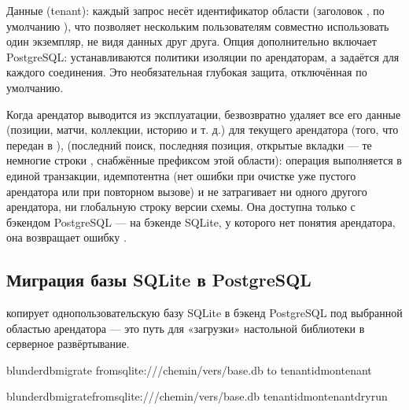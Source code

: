 \documentclass[letterpaper,10pt,russian]{sphinxmanual}
\begin{document}
\sphinxAtStartPar
Данные  (tenant): каждый запрос несёт идентификатор области (заголовок , по умолчанию ), что позволяет нескольким пользователям совместно использовать один экземпляр, не видя данных друг друга. Опция  дополнительно включает  PostgreSQL: устанавливаются политики изоляции по арендаторам, а  задаётся для каждого соединения. Это необязательная глубокая защита, отключённая по умолчанию.

\sphinxAtStartPar
Когда арендатор выводится из эксплуатации,  безвозвратно удаляет все его данные (позиции, матчи, коллекции, историю и т. д.) для текущего арендатора (того, что передан в ),  (последний поиск, последняя позиция, открытые вкладки — те немногие строки , снабжённые префиксом этой области): операция выполняется в единой транзакции, идемпотентна (нет ошибки при очистке уже пустого арендатора или при повторном вызове) и не затрагивает ни одного другого арендатора, ни глобальную строку версии схемы. Она доступна только с бэкендом PostgreSQL — на бэкенде SQLite, у которого нет понятия арендатора, она возвращает ошибку .


\subsection{Миграция базы SQLite в PostgreSQL}
\label{\detokenize{mode_headless:migrer-une-base-sqlite-vers-postgresql}}\label{\detokenize{mode_headless:headless-migrate}}
\sphinxAtStartPar
{} копирует однопользовательскую базу SQLite в бэкенд PostgreSQL под выбранной областью арендатора — это путь для «загрузки» настольной библиотеки в серверное развёртывание.

\begin{sphinxVerbatim}[commandchars=\\\{\}]
blunderdbmigrate
\PYGZhy{}\PYGZhy{}fromsqlite:///chemin/vers/base.db
\PYGZhy{}\PYGZhy{}to
\PYGZhy{}\PYGZhy{}tenant\PYGZhy{}idmon\PYGZhy{}tenant

blunderdbmigrate\PYGZhy{}\PYGZhy{}fromsqlite:///chemin/vers/base.db
\PYGZhy{}\PYGZhy{}tenant\PYGZhy{}idmon\PYGZhy{}tenant\PYGZhy{}\PYGZhy{}dry\PYGZhy{}run
\end{sphinxVerbatim}
\end{document}
